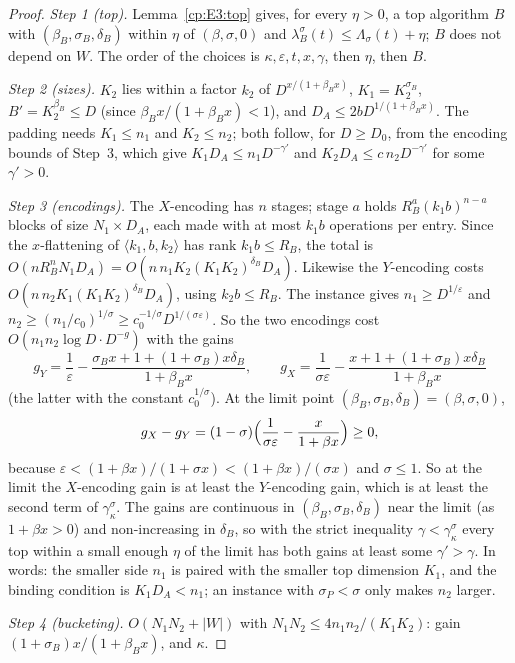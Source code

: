 \documentclass[11pt]{article}
\theoremstyle{definition}
\theoremstyle{remark}
\providecommand{\eps}{\varepsilon}
\newcommand{\abs}[1]{\lvert #1\rvert}
\newcommand{\mat}[3]{\langle #1,#2,#3\rangle} %
\newcommand{\delB}{\delta_B}                  %
\newcommand{\RB}{R_B}                         %
\newcommand{\Lam}{\Lambda}                    %
\newcommand{\gbound}[2]{\gamma^{#1}_{#2}}     %
\begin{document}
\begin{proof}
\emph{Step 1 (top).} Lemma~\ref{cp:E3:top} gives, for every $\eta>0$, a top algorithm $B$ with $(\beta_B,\sigma_B,\delB)$ within $\eta$ of $(\beta,\sigma,0)$ and $\lambda^\sigma_B(t)\le\Lam_\sigma(t)+\eta$; $B$ does not depend on $W$. The order of the choices is $\kappa,\eps,t,x,\gamma$, then $\eta$, then $B$.

\emph{Step 2 (sizes).} $K_2$ lies within a factor $k_2$ of $D^{x/(1+\beta_Bx)}$, $K_1=K_2^{\sigma_B}$, $B'=K_2^{\beta_B}\le D$ (since $\beta_Bx/(1+\beta_Bx)<1$), and $D_A\le2bD^{1/(1+\beta_Bx)}$. The padding needs $K_1\le n_1$ and $K_2\le n_2$; both follow, for $D\ge D_0$, from the encoding bounds of Step~3, which give $K_1D_A\le n_1D^{-\gamma'}$ and $K_2D_A\le c\,n_2D^{-\gamma'}$ for some $\gamma'>0$.

\emph{Step 3 (encodings).} The $X$-encoding has $n$ stages; stage $a$ holds $\RB^a(k_1b)^{n-a}$ blocks of size $N_1\times D_A$, each made with at most $k_1b$ operations per entry. Since the $x$-flattening of $\mat{k_1}b{k_2}$ has rank $k_1b\le\RB$, the total is $O(n\RB^nN_1D_A)=O(n\,n_1K_2(K_1K_2)^{\delB}D_A)$. Likewise the $Y$-encoding costs $O(n\,n_2K_1(K_1K_2)^{\delB}D_A)$, using $k_2b\le\RB$. The instance gives $n_1\ge D^{1/\eps}$ and $n_2\ge(n_1/c_0)^{1/\sigma}\ge c_0^{-1/\sigma}D^{1/(\sigma\eps)}$. So the two encodings cost $O(n_1n_2\log D\cdot D^{-g})$ with the gains
\[
g_Y=\frac1\eps-\frac{\sigma_Bx+1+(1+\sigma_B)x\delB}{1+\beta_Bx},\qquad g_X=\frac1{\sigma\eps}-\frac{x+1+(1+\sigma_B)x\delB}{1+\beta_Bx}
\]
(the latter with the constant $c_0^{1/\sigma}$). At the limit point $(\beta_B,\sigma_B,\delB)=(\beta,\sigma,0)$,
\[
g_X-g_Y=(1-\sigma)\Bigl(\frac1{\sigma\eps}-\frac x{1+\beta x}\Bigr)\ge0,
\]
because $\eps<(1+\beta x)/(1+\sigma x)<(1+\beta x)/(\sigma x)$ and $\sigma\le1$. So at the limit the $X$-encoding gain is at least the $Y$-encoding gain, which is at least the second term of $\gbound\sigma\kappa$. The gains are continuous in $(\beta_B,\sigma_B,\delB)$ near the limit (as $1+\beta x>0$) and non-increasing in $\delB$, so with the strict inequality $\gamma<\gbound\sigma\kappa$ every top within a small enough $\eta$ of the limit has both gains at least some $\gamma'>\gamma$. In words: the smaller side $n_1$ is paired with the smaller top dimension $K_1$, and the binding condition is $K_1D_A<n_1$; an instance with $\sigma_P<\sigma$ only makes $n_2$ larger.

\emph{Step 4 (bucketing).} $O(N_1N_2+\abs W)$ with $N_1N_2\le4n_1n_2/(K_1K_2)$: gain $(1+\sigma_B)x/(1+\beta_Bx)$, and $\kappa$.


\end{proof}
\end{document}
